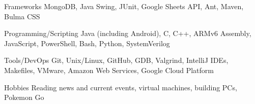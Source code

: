 

\begin{cvskills}

  \cvskill
    {Frameworks} %
    {MongoDB, Java Swing, JUnit, Google Sheets API, Ant, Maven, Bulma CSS} %

  \cvskill
    {Programming/Scripting} %
    {Java (including Android), C, C++, ARMv6 Assembly, JavaScript, PowerShell, Bash, Python, SystemVerilog} %
    
  \cvskill
    {Tools/DevOps} %
    {Git, Unix/Linux, GitHub, GDB, Valgrind, IntelliJ IDEs, Makefiles, VMware, Amazon Web Services, Google Cloud Platform} %

  \cvskill
  {Hobbies} %
  {Reading news and current events, virtual machines, building PCs, Pokemon Go} %

\end{cvskills}
